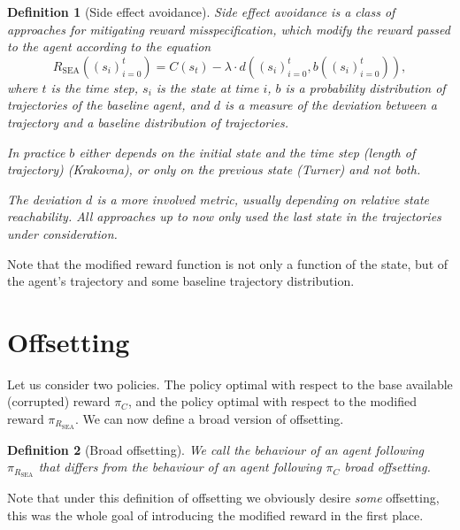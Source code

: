 \documentclass{article}
\newtheorem{definition}{Definition}
\newcommand{\rewardFunction}{R}
\newcommand{\modifiedRewardFunction}{\rewardFunction_{\mathrm{SEA}}}
\newcommand{\corruption}{C}
\newcommand{\deviationFromBaseline}{d}
\newcommand{\baseline}{b}
\begin{document}
	\begin{definition}[Side effect avoidance]
		\emph{Side effect avoidance} is a class of approaches for mitigating reward misspecification, which
		modify the reward passed to the agent according to the equation
		\begin{equation}
			\modifiedRewardFunction\left( \left( s_i \right)_{i=0}^t \right) =
			\corruption\left( s_t \right) - 
			\lambda \cdot \deviationFromBaseline\left( \left( s_i \right)_{i=0}^t, \baseline\left( \left( s_i \right)_{i=0}^t \right) \right),
			\label{eq:sideEffectAvoidance}
		\end{equation}
		where $t$ is the time step, $s_i$ is the state at time $i$, $\baseline$ is a probability
		distribution of trajectories of the baseline agent, and $\deviationFromBaseline$ is a measure
		of the deviation between a trajectory and a baseline distribution of trajectories.

		In practice $\baseline$ either depends on the initial state and the time step
		(length of trajectory) (Krakovna), or only on the previous state (Turner)	and not both.

		The deviation $\deviationFromBaseline$ is a more involved metric, usually depending on
		relative state	reachability. All approaches up to now only used the last state
		in the trajectories under consideration.
		\label{def:SEA}
	\end{definition}

	Note that the modified reward function is not only a function of the state, but of
	the agent's trajectory and some baseline trajectory distribution.

\section{Offsetting}

	Let us consider two policies. The policy optimal with respect to the base available
	(corrupted) reward $\pi_\corruption$, and the policy optimal with respect to the modified
	reward $\pi_{\modifiedRewardFunction}$.
	We can now define a broad version of offsetting.
	\begin{definition}[Broad offsetting]
		We call the behaviour of an agent following $\pi_{\modifiedRewardFunction}$ that differs
		from the behaviour of an agent following $\pi_\corruption$ \emph{broad offsetting}.
		\label{def:broadOffsetting}
	\end{definition}
	Note that under this definition of offsetting we obviously desire \emph{some} offsetting,
	this was the whole goal of introducing the modified reward in the first place.
\end{document}
